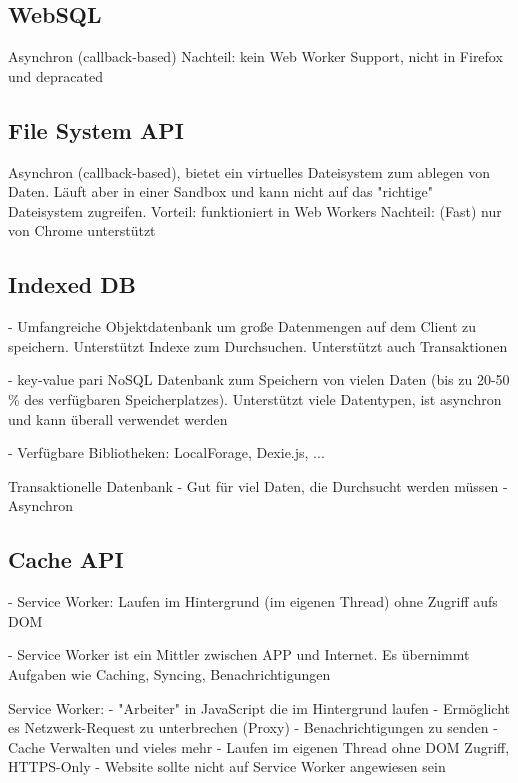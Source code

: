 \subsection{WebSQL}

Asynchron (callback-based)
Nachteil: kein Web Worker Support, nicht in Firefox und depracated
\autocite{Hajian2019}

\subsection{File System API}

Asynchron (callback-based), bietet ein virtuelles Dateisystem zum ablegen von Daten. Läuft aber in einer Sandbox und kann nicht auf das "richtige" Dateisystem zugreifen.
Vorteil: funktioniert in Web Workers 
Nachteil: (Fast) nur von Chrome unterstützt
\autocite{Hajian2019}

\subsection{Indexed DB}

- Umfangreiche Objektdatenbank um große Datenmengen auf dem Client zu speichern. Unterstützt Indexe zum Durchsuchen. Unterstützt auch Transaktionen \autocite{Sheppard2017} 

- key-value pari NoSQL Datenbank zum Speichern von vielen Daten (bis zu 20-50 \% des verfügbaren Speicherplatzes). Unterstützt viele Datentypen, ist asynchron und kann überall verwendet werden \autocite{Hajian2019}

- Verfügbare Bibliotheken: LocalForage, Dexie.js, ... \autocite{Hajian2019}

Transaktionelle Datenbank
- Gut für viel Daten, die Durchsucht werden müssen
- Asynchron

\subsection{Cache API}

- Service Worker: Laufen im Hintergrund (im eigenen Thread) ohne Zugriff aufs DOM \autocite{Sheppard2017}

- Service Worker ist ein Mittler zwischen APP und Internet. Es übernimmt Aufgaben wie Caching, Syncing, Benachrichtigungen \autocite{Sheppard2017}

Service Worker:
- "Arbeiter" in JavaScript die im Hintergrund laufen
- Ermöglicht es Netzwerk-Request zu unterbrechen (Proxy)
- Benachrichtigungen zu senden
- Cache Verwalten und vieles mehr
- Laufen im eigenen Thread ohne DOM Zugriff, HTTPS-Only
- Website sollte nicht auf Service Worker angewiesen sein
\autocite{Hajian2019}

